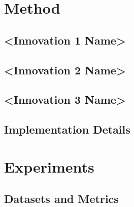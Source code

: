 \documentclass[conference]{IEEEtran}
\begin{document}
\section{Method}


\subsection{<Innovation 1 Name>}


\subsection{<Innovation 2 Name>}


\subsection{<Innovation 3 Name>}



\subsection{Implementation Details}


\section{Experiments}

\subsection{Datasets and Metrics}
\end{document}
